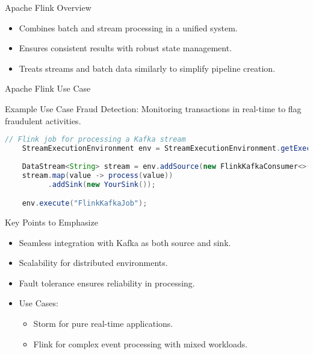 \documentclass[aspectratio=169]{beamer}
\begin{document}
\begin{frame}{Apache Flink Overview}
    \begin{itemize}
        \item Combines batch and stream processing in a unified system.
        \item Ensures consistent results with robust state management.
        \item Treats streams and batch data similarly to simplify pipeline creation.
    \end{itemize}
\end{frame}

\begin{frame}{Apache Flink Use Case}
    \begin{block}{Example Use Case}
        Fraud Detection: Monitoring transactions in real-time to flag fraudulent activities.
    \end{block}
    
    \begin{lstlisting}[language=Java]
    // Flink job for processing a Kafka stream
    StreamExecutionEnvironment env = StreamExecutionEnvironment.getExecutionEnvironment();
    
    DataStream<String> stream = env.addSource(new FlinkKafkaConsumer<>("topic", new SimpleStringSchema(), properties));
    stream.map(value -> process(value))
          .addSink(new YourSink());

    env.execute("FlinkKafkaJob");
    \end{lstlisting}
\end{frame}

\begin{frame}{Key Points to Emphasize}
    \begin{itemize}
        \item Seamless integration with Kafka as both source and sink.
        \item Scalability for distributed environments.
        \item Fault tolerance ensures reliability in processing.
        \item Use Cases:
            \begin{itemize}
                \item Storm for pure real-time applications.
                \item Flink for complex event processing with mixed workloads.
            \end{itemize}
    \end{itemize}
\end{frame}
\end{document}
